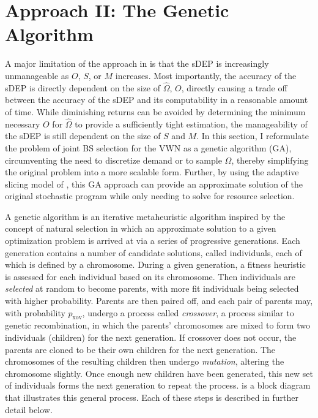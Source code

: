 \documentclass[12pt,dvipsnames]{report}
\begin{document}
\section{Approach II: The Genetic Algorithm} \label{sec:ga}

A major limitation of the approach in  is that the sDEP is increasingly unmanageable as $O$, $S$, or $M$ increases.  Most importantly, the accuracy of the sDEP is directly dependent on the size of $\hat{\Omega}$, $O$, directly causing a trade off between the accuracy of the sDEP and its computability in a reasonable amount of time.  While diminishing returns can be avoided by determining the minimum necessary $O$ for $\hat{\Omega}$ to provide a sufficiently tight estimation, the manageability of the sDEP is still dependent on the size of $S$ and $M$.  In this section, I reformulate the problem of joint BS selection for the VWN as a genetic algorithm (GA), circumventing the need to discretize demand or to sample $\Omega$, thereby simplifying the original problem into a more scalable form.  Further, by using the adaptive slicing model of , this GA approach can provide an approximate solution of the original stochastic program while only needing to solve for resource selection.

A genetic algorithm is an iterative metaheuristic algorithm inspired by the concept of natural selection in which an approximate solution to a given optimization problem is arrived at via a series of progressive generations.  Each generation contains a number of candidate solutions, called individuals, each of which is defined by a chromosome.  During a given generation, a fitness heuristic is assessed for each individual based on its chromosome.  Then individuals are \emph{selected} at random to become parents, with more fit individuals being selected with higher probability.  Parents are then paired off, and each pair of parents may, with probability $p_\text{xov}$, undergo a process called \emph{crossover}, a process similar to genetic recombination, in which the parents' chromosomes are mixed to form two individuals (children) for the next generation.  If crossover does not occur, the parents are cloned to be their own children for the next generation.  The chromosomes of the resulting children then undergo \emph{mutation}, altering the chromosome slightly.  Once enough new children have been generated, this new set of individuals forms the next generation to repeat the process.   is a block diagram that illustrates this general process.  Each of these steps is described in further detail below.
\end{document}
